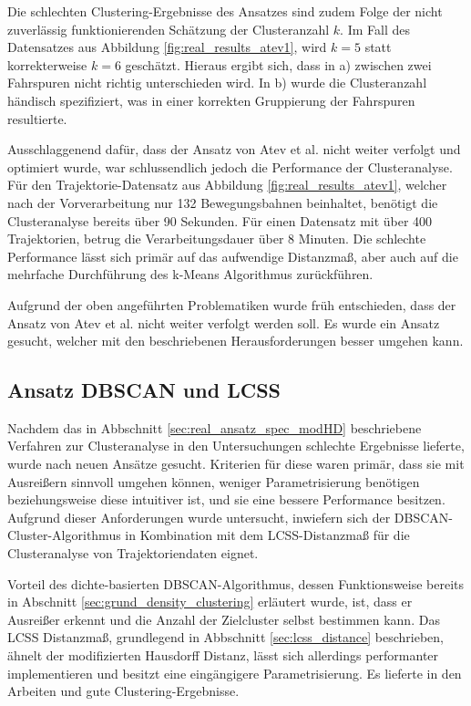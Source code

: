 Die schlechten Clustering-Ergebnisse des Ansatzes sind zudem Folge der nicht zuverlässig funktionierenden Schätzung
der Clusteranzahl $k$. Im Fall des Datensatzes aus Abbildung \ref{fig:real_results_atev1}, wird $k = 5$
statt korrekterweise $k = 6$ geschätzt. Hieraus ergibt sich, dass in a) zwischen zwei Fahrspuren nicht richtig unterschieden wird.
In b) wurde die Clusteranzahl händisch spezifiziert, was in einer korrekten Gruppierung der Fahrspuren resultierte.

Ausschlaggenend dafür, dass der Ansatz von Atev et al. nicht weiter verfolgt und optimiert wurde, war schlussendlich
jedoch die Performance der Clusteranalyse. Für den Trajektorie-Datensatz aus Abbildung \ref{fig:real_results_atev1},
welcher nach der Vorverarbeitung nur 132 Bewegungsbahnen beinhaltet, benötigt die Clusteranalyse bereits über
90 Sekunden. Für einen Datensatz mit über 400 Trajektorien, betrug die Verarbeitungsdauer über 8 Minuten.
Die schlechte Performance lässt sich primär auf das aufwendige Distanzmaß, aber auch auf die mehrfache
Durchführung des k-Means Algorithmus zurückführen.

Aufgrund der oben angeführten Problematiken wurde früh entschieden, dass der Ansatz von Atev et al. nicht weiter
verfolgt werden soll. Es wurde ein Ansatz gesucht, welcher mit den beschriebenen Herausforderungen besser
umgehen kann.

\subsection{Ansatz DBSCAN und LCSS}
\label{sec:real_ansatz_dbscan_lcss}

Nachdem das in Abbschnitt \ref{sec:real_ansatz_spec_modHD} beschriebene Verfahren zur Clusteranalyse in
den Untersuchungen schlechte Ergebnisse lieferte, wurde nach neuen Ansätze gesucht.
Kriterien für diese waren primär, dass sie mit Ausreißern sinnvoll umgehen können, weniger Parametrisierung
benötigen beziehungsweise diese intuitiver ist, und sie eine bessere Performance besitzen.
Aufgrund dieser Anforderungen wurde untersucht, inwiefern sich der DBSCAN-Cluster-Algorithmus
in Kombination mit dem LCSS-Distanzmaß für die Clusteranalyse von Trajektoriendaten eignet.

Vorteil des dichte-basierten DBSCAN-Algorithmus, dessen Funktionsweise bereits in Abschnitt
\ref{sec:grund_density_clustering} erläutert wurde, ist, dass er Ausreißer erkennt und die Anzahl der
Zielcluster selbst bestimmen kann. Das LCSS Distanzmaß, grundlegend in Abbschnitt \ref{sec:lcss_distance}
beschrieben, ähnelt der modifizierten Hausdorff Distanz, lässt sich allerdings performanter implementieren
und besitzt eine eingängigere Parametrisierung. Es lieferte in den Arbeiten \cite[]{Morris2011} und
\cite[]{Chen2014} gute Clustering-Ergebnisse.

